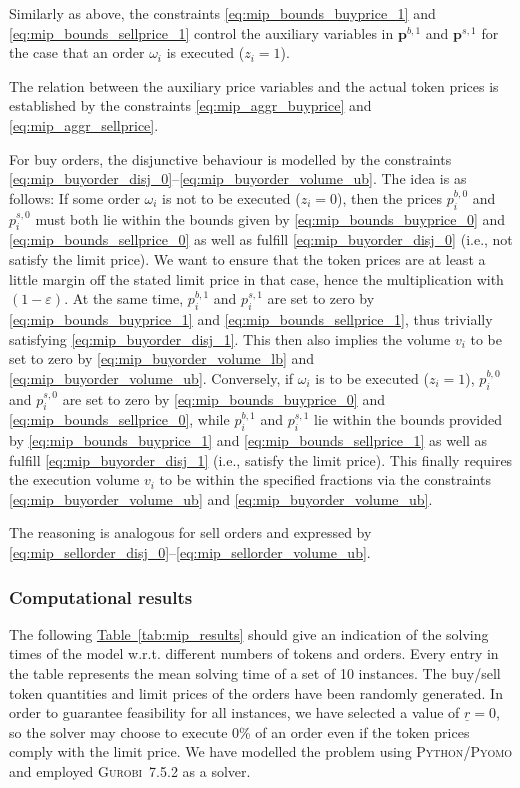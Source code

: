 \documentclass[11pt,parskip=full]{scrartcl}%
\newcommand*{\ie}{i.e., }
\newcommand*{\wrt}{w.r.t. }
\newcommand*{\tabref}[1]{\hyperref[{#1}]{Table~\ref*{#1}}}
\begin{document}
Similarly as above, the constraints \eqref{eq:mip_bounds_buyprice_1} and
\eqref{eq:mip_bounds_sellprice_1} control the auxiliary variables in $ \mathbf{p}^{b,1} $ and $ 
\mathbf{p}^{s,1} $ for the case that an order $ \omega_i $ is executed ($ z_i = 1 $).

The relation between the auxiliary price variables and the actual token prices is established by
the constraints \eqref{eq:mip_aggr_buyprice} and \eqref{eq:mip_aggr_sellprice}.

For buy orders, the disjunctive behaviour is modelled by the constraints
\eqref{eq:mip_buyorder_disj_0}--\eqref{eq:mip_buyorder_volume_ub}.
The idea is as follows:
If some order $ \omega_i $ is not to be executed ($ z_i = 0 $), then the prices
$ p_i^{b,0} $ and $ p_i^{s,0} $ must both lie within the bounds given by
\eqref{eq:mip_bounds_buyprice_0} and \eqref{eq:mip_bounds_sellprice_0} as well as fulfill
\eqref{eq:mip_buyorder_disj_0} (\ie not satisfy the limit price).
We want to ensure that the token prices are at least a little margin off the stated limit price in
that case, hence the multiplication with $ (1-\varepsilon) $.
At the same time, $ p_i^{b,1} $ and $ p_i^{s,1} $ are set to zero by
\eqref{eq:mip_bounds_buyprice_1} and \eqref{eq:mip_bounds_sellprice_1}, thus trivially satisfying
\eqref{eq:mip_buyorder_disj_1}.
This then also implies the volume $ v_i $ to be set to zero by \eqref{eq:mip_buyorder_volume_lb}
and \eqref{eq:mip_buyorder_volume_ub}.
Conversely, if $ \omega_i $ is to be executed ($ z_i = 1 $), $ p_i^{b,0} $ and $ p_i^{s,0} $ are
set to zero by \eqref{eq:mip_bounds_buyprice_0} and \eqref{eq:mip_bounds_sellprice_0}, while
$ p_i^{b,1} $ and $ p_i^{s,1} $ lie within the bounds provided by \eqref{eq:mip_bounds_buyprice_1}
and \eqref{eq:mip_bounds_sellprice_1} as well as fulfill \eqref{eq:mip_buyorder_disj_1} (\ie
satisfy the limit price).
This finally requires the execution volume $ v_i $ to be within the specified fractions via the
constraints \eqref{eq:mip_buyorder_volume_ub} and \eqref{eq:mip_buyorder_volume_ub}.

The reasoning is analogous for sell orders and expressed by
\eqref{eq:mip_sellorder_disj_0}--\eqref{eq:mip_sellorder_volume_ub}.


\subsubsection*{Computational results}

The following \tabref{tab:mip_results} should give an indication of the solving times of the model
\wrt different numbers of tokens and orders.
Every entry in the table represents the mean solving time of a set of 10 instances.
The buy/sell token quantities and limit prices of the orders have been randomly generated.
In order to guarantee feasibility for all instances, we have selected a value of $ \underline{r} =
0 $, so the solver may choose to execute 0\% of an order even if the token prices comply with the
limit price.
We have modelled the problem using \textsc{Python}/\textsc{Pyomo} and employed
\textsc{Gurobi}~7.5.2 as a solver.
\end{document}

